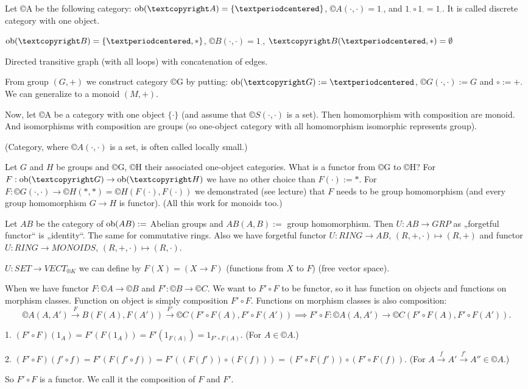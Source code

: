 \documentclass[12pt]{article}					%
\begin{document}
\begin{priklady}
	Let ©A be the following category: $\ob(©A) = \{·\}$, $©A(·, ·) = 1_·$, and $1_· ∘ 1_· = 1_·$. It is called discrete category with one object.

	$\ob(©B) = \{·, *\}$, $©B(·, ·) = 1_·$, $©B(·, *) = \O$

	Directed transitive graph (with all loops) with concatenation of edges.

	From group $(G, +)$ we construct category ©G by putting: $\ob(©G) := {·}$, $©G(·, ·) := G$ and $∘ := +$. We can generalize to a monoid $(M, +)$.

	Now, let ©A be a category with one object $\{·\}$ (and assume that $©S(·, ·)$ is a set). Then homomorphism with composition are monoid. And isomorphisms with composition are groups (so one-object category with all homomorphism isomorphic represents group).

	(Category, where $©A(·, ·)$ is a set, is often called locally small.)

	Let $G$ and $H$ be groups and ©G, ©H their associated one-object categories. What is a functor from ©G to ©H? For $F: \ob(©G) \rightarrow \ob(©H)$ we have no other choice than $F(·) := *$. For $F: ©G(·, ·) \rightarrow ©H(*, *) = ©H(F(·), F(·))$ we demonstrated (see lecture) that $F$ needs to be group homomorphism (and every group homomorphism $G \rightarrow H$ is functor). (All this work for monoids too.)

	Let $AB$ be the category of $\operatorname{ob}(AB) :=$ Abelian groups and $AB(A, B) :=$ group homomorphism. Then $U: AB \rightarrow GRP$ as „forgetful functor“ is „identity“. The same for commutative rings. Also we have forgetful functor $U: RING \rightarrow AB$, $(R, +, ·) \mapsto (R, +)$ and functor $U: RING \rightarrow MONOIDS$, $(R, +, ·) \mapsto (R, ·)$.

	$U: SET \rightarrow VECT_{®K}$ we can define by $F(X) = (X \rightarrow F)$ (functions from $X$ to $F$) (free vector space).
\end{priklady}


\begin{definice}
	When we have functor $F: ©A \rightarrow ©B$ and $F': ©B \rightarrow ©C$. We want to $F' ∘ F$ to be functor, so it has function on objects and functions on morphism classes. Function on object is simply composition $F' ∘ F$. Functions on morphism classes is also composition:
	$$ ©A(A, A') \overset{F}\rightarrow B(F(A), F(A')) \overset{F'}\rightarrow ©C(F'∘F(A), F'∘F(A')) \implies F'∘F: ©A(A, A') \rightarrow ©C(F'∘F(A), F'∘F(A')). $$

	\begin{dukazin}
		1. $(F'∘F)(1_A) = F'(F(1_A)) = F'(1_{F(A)}) = 1_{F'∘F(A)}$. (For $A \in ©A$.)

		2. $(F'∘F)(f'∘f) = F'(F(f'∘f)) = F'((F(f')) ∘ (F(f))) = (F'∘F(f')) ∘ (F'∘F(f))$. (For $A \overset{f}\rightarrow A'\overset{f'}\rightarrow A'' \in ©A$.)
	\end{dukazin}

	So $F' ∘ F$ is a functor. We call it the composition of $F$ and $F'$.
\end{definice}
\end{document}
